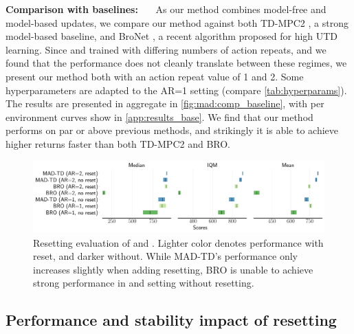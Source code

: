 \textbf{Comparison with baselines:}~~~
As our method combines model-free and model-based updates, we compare our method against both TD-MPC2 \parencite{hansen2024tdmpc}, a strong model-based baseline, and BroNet \parencite{nauman2024bigger}, a recent algorithm proposed for high UTD learning.
Since \textcite{nauman2024bigger} and \textcite{hansen2024tdmpc} trained with differing numbers of action repeats, and we found that the performance does not cleanly translate between these regimes, we present our method both with an action repeat value of 1 and 2.
Some hyperparameters are adapted to the AR=1 setting (compare \autoref{tab:hyperparams}).
The results are presented in aggregate in \autoref{fig:mad:comp_baseline}, with per environment curves show in \autoref{app:results_base}.
We find that our method performs on par or above previous methods, and strikingly it is able to achieve higher returns faster than both TD-MPC2 and BRO.

\begin{figure}[t]
    \centering
    \includegraphics[width=1.\linewidth]{figures/mad-td/reset_rliable_comp.pdf}
    \caption{Resetting evaluation of  and . Lighter color denotes performance with reset, and darker without. While MAD-TD's performance only increases slightly when adding resetting, BRO is unable to achieve strong performance in and setting without resetting.}
    \label{fig:mad:comp_reset}
\end{figure}

\subsection{Performance and stability impact of resetting}


